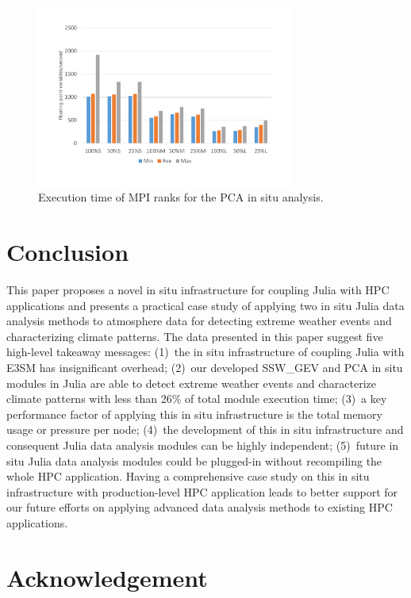 \documentclass{juliacon}
\begin{document}
\begin{figure}
    \centering
    \includegraphics[width=\linewidth, height=6cm]{figures/pca_outliers.pdf}
    \caption{Execution time of MPI ranks for the PCA in situ analysis.}
    \label{fig:pca_outliers}
\end{figure}







\section{Conclusion} \label{sec6}



This paper proposes a novel in situ infrastructure for coupling Julia with HPC applications and presents a practical case study of applying two in situ Julia data analysis methods to atmosphere data for detecting extreme weather events and characterizing climate patterns. The data presented in this paper suggest five high-level takeaway messages: (1)~the in situ infrastructure of coupling Julia with E3SM has insignificant overhead; (2)~our developed SSW\_GEV and PCA in situ modules in Julia are able to detect extreme weather events and characterize climate patterns with less than 26\% of total module execution time; (3)~a key performance factor of applying this in situ infrastructure is the total memory usage or pressure per node; (4)~the development of this in situ infrastructure and consequent Julia data analysis modules can be highly independent; (5)~future in situ Julia data analysis modules could be plugged-in without recompiling the whole HPC application. Having a comprehensive case study on this in situ infrastructure with production-level HPC application leads to better support for our future efforts on applying advanced data analysis methods to existing HPC applications.


\section*{Acknowledgement}
\end{document}
